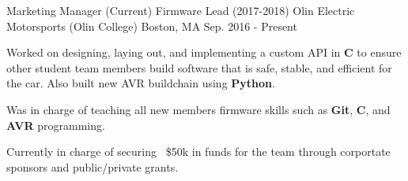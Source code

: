\begin{cventries}
  \cventry
    {Marketing Manager (Current) Firmware Lead (2017-2018)} %
    {Olin Electric Motorsports (Olin College)} %
    {Boston, MA} %
    {Sep. 2016 - Present} %
    {
      \begin{cvitems} %
        \item Worked on designing, laying out, and implementing a custom API in \textbf{C} to ensure other student team members build software that is safe, stable, and efficient for the car. Also built new AVR buildchain using \textbf{Python}.
        \item Was in charge of teaching all new members firmware skills such as \textbf{Git}, \textbf{C}, and \textbf{AVR} programming.
        \item Currently in charge of securing ~\$50k in funds for the team through corportate sponsors and public/private grants.
      \end{cvitems}
    }

\end{cventries}
